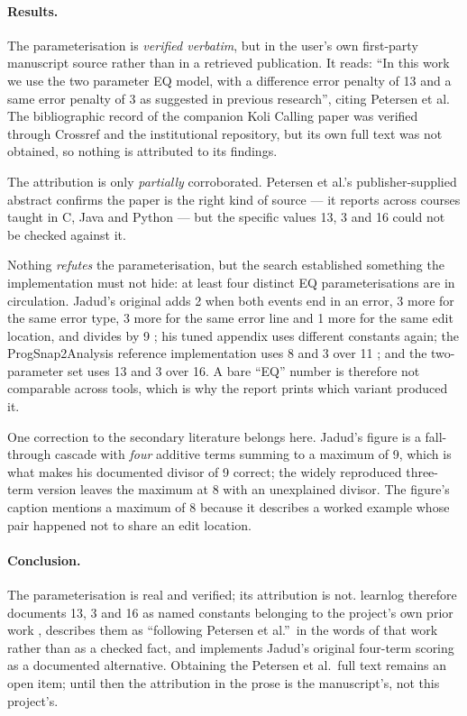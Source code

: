 \paragraph{Results.}
The parameterisation is \emph{verified verbatim}, but in the user's own
first-party manuscript source rather than in a retrieved publication.  It
reads: \enquote{In this work we use the two parameter EQ model, with a
difference error penalty of 13 and a same error penalty of 3 as suggested in
previous research}, citing Petersen et al.  The bibliographic record of the
companion Koli Calling paper \autocite{snider2023edit} was verified through
Crossref and the institutional repository, but its own full text was not
obtained, so nothing is attributed to its findings.

The attribution is only \emph{partially} corroborated.  Petersen et al.'s
publisher-supplied abstract confirms the paper is the right kind of source
--- it reports 
across courses taught in C, Java and Python --- but the specific values
13, 3 and 16 could not be checked against it.

Nothing \emph{refutes} the parameterisation, but the search established
something the implementation must not hide: at least four distinct EQ
parameterisations are in circulation.  Jadud's original adds 2 when both
events end in an error, 3 more for the same error type, 3 more for the same
error line and 1 more for the same edit location, and divides by 9
\autocite{jadud2005thesis}; his tuned appendix uses different constants
again; the ProgSnap2Analysis reference implementation uses 8 and 3 over 11
\autocite{price2020progsnap2}; and the two-parameter set uses 13 and 3 over
16.  A bare \enquote{EQ} number is therefore not comparable across tools,
which is why the report prints which variant produced it.

One correction to the secondary literature belongs here.  Jadud's figure is
a fall-through cascade with \emph{four} additive terms summing to a maximum
of 9, which is what makes his documented divisor of 9 correct; the widely
reproduced three-term version leaves the maximum at 8 with an unexplained
divisor.  The figure's caption mentions a maximum of 8 because it describes
a worked example whose pair happened not to share an edit location.

\paragraph{Conclusion.}
The parameterisation is real and verified; its attribution is not.  learnlog
therefore documents 13, 3 and 16 as named constants belonging to the
project's own prior work \autocite{snider2023edit}, describes them as
\enquote{following Petersen et al.}\ in the words of that work rather than
as a checked fact, and implements Jadud's original four-term scoring
\autocite{jadud2005thesis} as a documented alternative.  Obtaining the
Petersen et al.\ full text remains an open item; until then the attribution
in the prose is the manuscript's, not this project's.

